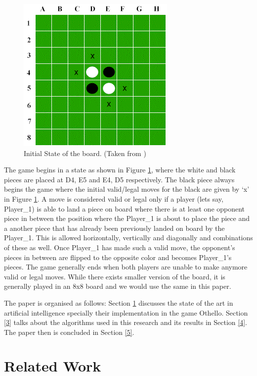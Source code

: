 \documentclass{svproc}
\begin{document}
\begin{figure}
\centering
\includegraphics[scale=0.5]{img1.png}
\caption{Initial State of the board. (Taken from \cite{image_website})} \label{fig1}
\end{figure}

The game begins in a state as shown in Figure \ref{fig1}, where the white and black pieces are placed at D4, E5 and E4, D5 respectively. The black piece always begins the game where the initial valid/legal moves for the black are given by ‘x’ in Figure \ref{fig1}. A move is considered valid or legal only if a player (lets say, Player\_1) is able to land a piece on board where there is at least one opponent piece in between the position where the Player\_1 is about to place the piece and a another piece that has already been previously landed on board by the Player\_1. This is allowed horizontally, vertically and diagonally and combinations of these as well. Once Player\_1 has made such a valid move, the opponent's pieces in between are flipped to the opposite color and becomes Player\_1's pieces. The game generally ends when both players are unable to make anymore valid or legal moves. While there exists smaller version of the board, it is generally played in an 8x8 board and we would use the same in this paper.

The paper is organised as follows: Section \ref{2} discusses the state of the art in artificial intelligence specially their implementation in the game Othello. Section \ref{3} talks about the algorithms used in this research and its results in Section \ref{4}. The paper then is concluded in Section \ref{5}.

\section{Related Work}\label{2}
\end{document}
